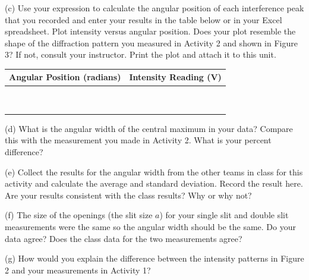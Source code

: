 (c) Use your expression to calculate the angular position of each
interference peak that you recorded and enter your results in the
table below or in your Excel spreadsheet. Plot intensity versus angular position.
Does your plot resemble the shape of the diffraction pattern you measured in
Activity 2 and shown
in Figure 3? If not, consult your instructor. Print the plot and attach
it to this unit.

\vspace{0.3cm}
{\centering \begin{tabular}{|c|c|}
\hline 
Angular Position (radians)&
Intensity Reading (V)\\
\hline
\hline
&
\\
\hline 
&
\\
\hline 
&
\\
\hline 
&
\\
\hline 
&
\\
\hline 
&
\\
\hline 
&
\\
\hline 
&
\\
\hline 
&
\\
\hline
\end{tabular}\par}
\vspace{0.3cm}

(d) What is the angular width of the central maximum in your data?
Compare this with the measurement you made in Activity 2.
What is your percent difference?
\vspace{25mm}

(e) Collect the results for the angular width from the other teams in class
for this activity and calculate the average and standard deviation. Record the result here.
Are your results consistent with the class results? Why or why not?
\vspace{30mm}

(f) The size of the openings (the slit size $a$) for your single slit and double slit
measurements were the same so the angular width should be the same. Do your data agree?
Does the class data for the two measurements agree?
\vspace{20mm}

(g) How would you explain the difference between the intensity patterns
in Figure 2 and your measurements in Activity 1?
\vspace{20mm}

